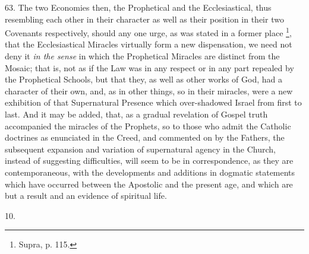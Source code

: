 63.
The two Economies then, the Prophetical and the Ecclesiastical, thus
resembling each other in their character as well as their position in
their two Covenants respectively, should any one urge, as was stated
in a former place \footnote{Supra, p. 115.}, that the Ecclesiastical Miracles
virtually form a new dispensation, we need not deny it \emph{in the sense}
in which the Prophetical Miracles are distinct from the Mosaic; that
is, not as if the Law was in any respect or in any part repealed by
the Prophetical Schools, but that they, as well as other works of God,
had a character of their own, and, as in other things, so in their
miracles, were a new exhibition of that Supernatural Presence which
over-shadowed Israel from first to last. And it may be added, that, as
a gradual revelation of Gospel truth accompanied the miracles of the
Prophets, so to those who admit the Catholic doctrines as enunciated
in the Creed, and commented on by the Fathers, the subsequent
expansion and variation of supernatural agency in the Church, instead
of suggesting difficulties, will seem to be in correspondence, as they
are contemporaneous, with the developments and additions in
dogmatic statements which have occurred between the Apostolic and the
present age, and which are but a result and an evidence of spiritual
life.

10.

